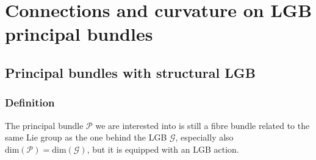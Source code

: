 \documentclass[a4paper,oneside,11pt,bibliography=totoc]{scrartcl}
\theoremstyle{plain}
\theoremstyle{remark}
\theoremstyle{definition}
\begin{document}
\section{Connections and curvature on LGB principal bundles}\label{ConnCurvOnPrincLGBBundle}

\subsection{Principal bundles with structural LGB}\label{PrincBundlLGBBased}

\subsubsection{Definition}

The principal bundle $\mathcal{P}$ we are interested into is still a fibre bundle related to the same Lie group as the one behind the LGB $\mathcal{G}$, especially also $\mathrm{dim}(\mathcal{P}) = \mathrm{dim}(\mathcal{G})$, but it is equipped with an LGB action.
\end{document}
